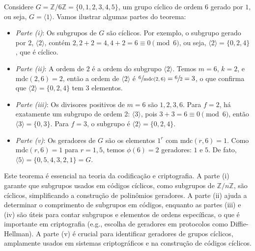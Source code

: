 \begin{example}
  Considere $G = \mathbb{Z}/6\mathbb{Z} = \{0, 1, 2, 3, 4, 5\}$, um grupo cíclico
  de ordem 6 gerado por $1$, ou seja, $G = \langle 1 \rangle$. Vamos ilustrar
  algumas partes do teorema:
\begin{itemize}
    \item \emph{Parte (i)}: Os subgrupos de $G$ são cíclicos. Por exemplo, o
      subgrupo gerado por $2$, $\langle 2 \rangle$, contém $2, 2+2=4, 4+2=6
      \equiv 0 \pmod{6}$, ou seja, $\langle 2 \rangle = \{0, 2, 4\}$, que é
      cíclico.
    \item \emph{Parte (ii)}: A ordem de $2$ é a ordem do subgrupo $\langle 2
      \rangle$. Temos $m = 6$, $k = 2$, e $\text{mdc}(2, 6) = 2$, então a ordem
      de $\langle 2 \rangle$ é $\sfrac{6}{\text{mdc}(2, 6)} = \sfrac{6}{2} = 3$,
      o que confirma que $\langle 2 \rangle = \{0, 2, 4\}$ tem 3 elementos.
    \item \emph{Parte (iii)}: Os divisores positivos de $m = 6$ são $1, 2, 3,
      6$. Para $f = 2$, há exatamente um subgrupo de ordem 2: $\langle 3
      \rangle$, pois $3+3=6 \equiv 0 \pmod{6}$, então $\langle 3 \rangle = \{0,
      3\}$. Para $f = 3$, o subgrupo é $\langle 2 \rangle = \{0, 2, 4\}$.
    \item \emph{Parte (v)}: Os geradores de $G$ são os elementos $1^r$ com
      $\text{mdc}(r, 6) = 1$. Como $\text{mdc}(r, 6) = 1$ para $r = 1, 5$,
      temos $\phi(6) = 2$ geradores: $1$ e $5$. De fato, $\langle 5 \rangle =
      \{0, 5, 4, 3, 2, 1\} = G$.
\end{itemize}
\end{example}

\begin{remark}
  Este teorema é essencial na teoria da codificação e criptografia. A parte (i)
  garante que subgrupos usados em códigos cíclicos, como subgrupos de
  $\mathbb{Z}/n\mathbb{Z}$, são cíclicos, simplificando a construção de
  polinômios geradores. A parte (ii) ajuda a determinar o comprimento de
  subgrupos em códigos, enquanto as partes (iii) e (iv) são úteis para contar
  subgrupos e elementos de ordens específicas, o que é importante em
  criptografia (e.g., escolha de geradores em protocolos como Diffie-Hellman).
  A parte (v) é crucial para identificar geradores de grupos cíclicos,
  amplamente usados em sistemas criptográficos e na construção de códigos
  cíclicos.
\end{remark}









